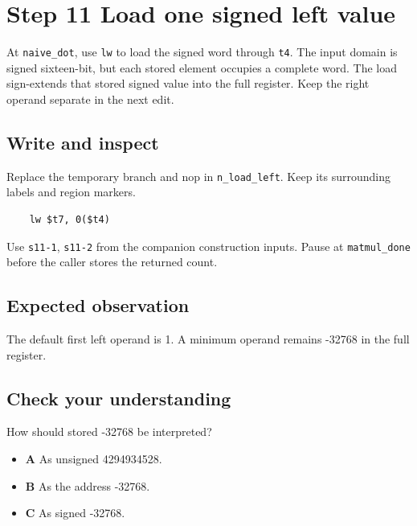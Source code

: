 \section{Step 11 Load one signed left value}\label{matmul-s11}

At \texttt{naive\_dot}, use \texttt{lw} to load the signed word through \texttt{t4}. The input domain is signed sixteen-bit, but each stored element occupies a complete word. The load sign-extends that stored signed value into the full register. Keep the right operand separate in the next edit.

\subsection{Write and inspect}
Replace the temporary branch and nop in \texttt{n\_load\_left}. Keep its surrounding labels and region markers.

\begin{verbatim}
    lw $t7, 0($t4)
\end{verbatim}
Use \texttt{s11-1}, \texttt{s11-2} from the companion construction inputs. Pause at \texttt{matmul\_done} before the caller stores the returned count.

\subsection{Expected observation}
The default first left operand is 1. A minimum operand remains -32768 in the full register.

\subsection{Check your understanding}
How should stored -32768 be interpreted?

\begin{itemize}
\item \textbf{A} As unsigned 4294934528.
\item \textbf{B} As the address -32768.
\item \textbf{C} As signed -32768.
\end{itemize}
